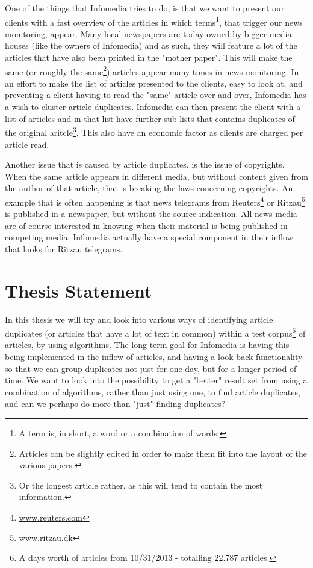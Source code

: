 One of the things that Infomedia tries to do, is that we want to present our clients with a fast overview of the articles in which terms\footnote{A term is, in short, a word or a combination of words.}, that trigger our news monitoring, appear. Many local newspapers are today owned by bigger media houses (like the owners of Infomedia) and as such, they will feature a lot of the articles that have also been printed in the "mother paper". This will make the same (or roughly the same\footnote{Articles can be slightly edited in order to make them fit into the layout of the various papers.}) articles appear many times in news monitoring. In an effort to make the list of articles presented to the clients, easy to look at, and preventing a client having to read the "same" article over and over, Infomedia has a wish to cluster article duplicates. Infomedia can then present the client with a list of articles and in that list have further sub lists that contains duplicates of the original aritcle\footnote{Or the longest article rather, as this will tend to contain the most information.}. This also have an economic factor as clients are charged per article read.

Another issue that is caused by article duplicates, is the issue of copyrights. When the same article appears in different media, but without content given from the author of that article, that is breaking the laws concerning copyrights. An example that is often happening is that news telegrams from Reuters\footnote{\url{www.reuters.com}} or Ritzau\footnote{\url{www.ritzau.dk}} is published in a newspaper, but without the source indication. All news media are of course interested in knowing when their material is being published in competing media. Infomedia actually have a special component in their inflow that looks for Ritzau telegrams.

\section{Thesis Statement}

In this thesis we will try and look into various ways of identifying article duplicates (or articles that have a lot of text in common) within a test corpus\footnote{A days worth of articles from 10/31/2013 - totalling 22.787 articles.} of articles, by using algorithms. The long term goal for Infomedia is having this being implemented in the inflow of articles, and having a look back functionality so that we can group duplicates not just for one day, but for a longer period of time. We want to look into the possibility to get a "better" result set from using a combination of algorithms, rather than just using one, to find article duplicates, and can we perhaps do more than "just" finding duplicates?

